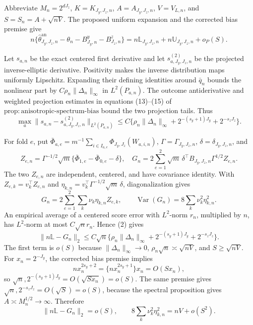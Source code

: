 Abbreviate \(M_n=2^{dJ_z}\), \(K=K_{J_y,J_z,n}\), \(A=A_{J_y,J_z,n}\), \(V=V_{L,n}\), and \(S=S_n=A+\sqrt{nV}\). The proposed uniform expansion and the corrected bias premise give
\[
n\{\widehat\theta^{\mathrm{an}}_{J_y,J_z,n}-\theta_n-B^y_{J_y,n}-B^z_{J_z,n}\}
=n\mathbb L_{J_y,J_z,n}+n\mathbb U_{J_y,J_z,n}+o_P(S).          \tag{1}
\]

Let \(s_{a,n}\) be the exact centered first derivative and let \(s^{(2)}_{a,J_y,J_z,n}\) be the projected inverse-elliptic derivative. Positivity makes the inverse distribution maps uniformly Lipschitz. Expanding their defining identities around \(\bar q_n\) bounds the nonlinear part by \(C\rho_n\|\Delta_n\|_\infty\) in \(L^2(P_{a,n})\). The outcome antiderivative and weighted projection estimates in equations (13)--(15) of \(\mathrm{prop{:}anisotropic\text{-}spectrum\text{-}bias}\) bound the two projection tails. Thus
\[
\max_a\|s_{a,n}-s^{(2)}_{a,J_y,J_z,n}\|_{L^2(P_{a,n})}
\le C\{\rho_n\|\Delta_n\|_\infty+2^{-(s_y+1)J_y}+2^{-s_zJ_z}\}. \tag{2}
\]

For fold \(e\), put \(\bar\Phi_{a,e}=m^{-1}\sum_{i\in I_{a,e}}\Phi_{J_y,J_z}(W_{a,i,n})\), \(\Gamma=\Gamma_{J_y,J_z,n}\), \(\delta=\delta_{J_y,J_z,n}\), and
\[
Z_{e,n}=\Gamma^{-1/2}\sqrt m\{\bar\Phi_{1,e}-\bar\Phi_{0,e}-\delta\},
\quad
G_n=2\sum_{e=1}^2\sqrt m\,\delta^\top B_{J_y,J_z,n}\Gamma^{1/2}Z_{e,n}. \tag{3}
\]
The two \(Z_{e,n}\) are independent, centered, and have covariance identity. With \(Z_{e,k}=v_k^\top Z_{e,n}\) and \(\eta_{k,n}=v_k^\top\Gamma^{-1/2}\sqrt m\,\delta\), diagonalization gives
\[
G_n=2\sum_{e=1}^2\sum_k\nu_k\eta_{k,n}Z_{e,k},
\qquad
\operatorname{Var}(G_n)=8\sum_k\nu_k^2\eta_{k,n}^2.             \tag{4}
\]
An empirical average of a centered score error with \(L^2\)-norm \(r_n\), multiplied by \(n\), has \(L^2\)-norm at most \(C\sqrt n r_n\). Hence (2) gives
\[
\|n\mathbb L-G_n\|_2
\le C\sqrt n\{\rho_n\|\Delta_n\|_\infty+2^{-(s_y+1)J_y}+2^{-s_zJ_z}\}. \tag{5}
\]
The first term is \(o(S)\) because \(\|\Delta_n\|_\infty\to0\), \(\rho_n\sqrt n\asymp\sqrt{nV}\), and \(S\ge\sqrt{nV}\). For \(x_n=2^{-J_y}\), the corrected bias premise implies
\[
n x_n^{2s_y+2}=\{n x_n^{2s_y+1}\}x_n=O(Sx_n),
\]
so \(\sqrt n,2^{-(s_y+1)J_y}=O(\sqrt{Sx_n})=o(S)\). The same premise gives \(\sqrt n,2^{-s_zJ_z}=O(\sqrt S)=o(S)\), because the spectral proposition gives \(A\asymp M_n^{1/2}\to\infty\). Therefore
\[
\|n\mathbb L-G_n\|_2=o(S),
\qquad
8\sum_k\nu_k^2\eta_{k,n}^2=nV+o(S^2).                           \tag{6}
\]


